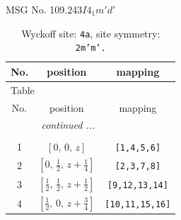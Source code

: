 \documentclass[fleqn,8pt]{jsarticle}
\begin{document}
\setcounter{MaxMatrixCols}{32}

\renewcommand{\tablename}{Table~}
\renewcommand{\figurename}{Figure~}
\begin{center}
\LARGE
MSG No. 109.243\quad$I4_{1}m'd'$
\end{center}
\renewcommand{\arraystretch}{1.2}
\begin{longtable}{ccc}
\caption{Wyckoff site: {\tt 4a}, site symmetry: {\tt 2m'm'.}}
 \\
 \hline \hline
No. & position & mapping \\ \hline \endfirsthead

\multicolumn{2}{l}{\tablename\ \thetable{}} \\
 \hline \hline
No. & position & mapping \\ \hline \endhead

 \hline \hline
\multicolumn{2}{r}{\footnotesize\it continued ...} \\ \endfoot

 \hline \hline
\multicolumn{2}{r}{} \\ \endlastfoot

1 & $\left[ 0,\, 0,\, z \right]$ & {\tt [1,4,5,6]} \\ \hline
2 & $\left[ 0,\, \frac{1}{2},\, z + \frac{1}{4} \right]$ & {\tt [2,3,7,8]} \\ \hline
3 & $\left[ \frac{1}{2},\, \frac{1}{2},\, z + \frac{1}{2} \right]$ & {\tt [9,12,13,14]} \\ \hline
4 & $\left[ \frac{1}{2},\, 0,\, z + \frac{3}{4} \right]$ & {\tt [10,11,15,16]} \\
\end{longtable}
\renewcommand{\arraystretch}{1.2}
\end{document}
